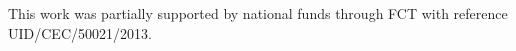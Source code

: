 
\section*{\acknowledgments}


This work was partially supported by national funds through FCT with reference UID/CEC/50021/2013. 


\cleardoublepage




